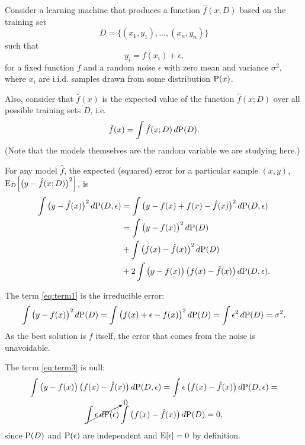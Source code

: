 Consider a learning machine that produces a function $\hat{f}(x; D)$ based on the
training set $$D = \big\{(x_1, y_1), \dots, (x_n, y_n)\big\}$$ such that
\[
  y_i = f(x_i) + \epsilon\text{,}
\]
for a fixed function $f$ and a random noise $\epsilon$ with zero mean and variance
$\sigma^2$, where $x_i$ are i.i.d. samples drawn from some distribution $\operatorname{P}(x)$.

Also, consider that $\bar{f}(x)$ is the expected value of the function $\hat{f}(x; D)$
over all possible training sets $D$, i.e.
\[
  \bar{f}(x) = \int \hat{f}(x; D)\, d\!\operatorname{P}(D)\text{.}
\]
(Note that the models themselves are the random variable we are studying here.)

For any model $\hat{f}$, the expected (squared) error for a particular sample $(x, y)$,
$\operatorname{E}_D\!\left[ \big( y - \hat{f}(x; D) \big)^2 \right]$, is
\begin{align}
  \notag \int \big( y - \hat{f}(x) \big)^2\, d\!\operatorname{P}(D, \epsilon)
    &= \int \big( y - f(x) + f(x) - \hat{f}(x) \big)^2\, d\!\operatorname{P}(D, \epsilon) \\
    &= \label{eq:term1}\int \big( y - f(x) \big)^2\, d\!\operatorname{P}(D) \\
    &+ \label{eq:term2}\int \big( f(x) - \hat{f}(x) \big)^2\, d\!\operatorname{P}(D) \\
    &+ \label{eq:term3}2 \int \big( y - f(x) \big)\,\big( f(x) - \hat{f}(x) \big)\, d\!\operatorname{P}(D, \epsilon)\text{.}
\end{align}

The term \eqref{eq:term1} is the irreducible error:
\begin{equation}
  \label{eq:irreducible-error}
  \int \big( y - f(x) \big)^2\, d\!\operatorname{P}(D) =
  \int \big( f(x) + \epsilon - f(x) \big)^2\, d\!\operatorname{P}(D) =
  \int \epsilon^2\, d\!\operatorname{P}(D) = \sigma^2\text{.}
\end{equation}
As the best solution is $f$ itself, the error that comes from the noise is unavoidable.

The term \eqref{eq:term3} is null:
\begin{multline*}
  \int \big( y - f(x) \big)\,\big( f(x) - \hat{f}(x) \big)\, d\!\operatorname{P}(D, \epsilon) =
  \int \epsilon\,\big( f(x) - \hat{f}(x) \big)\, d\!\operatorname{P}(D, \epsilon) = \\
  \cancelto{0}{\int \epsilon\, d\!\operatorname{P}(\epsilon)} \int \big( f(x) - \hat{f}(x) \big)\, d\!\operatorname{P}(D) = 0\text{,}
\end{multline*}
since $\operatorname{P}(D)$ and $\operatorname{P}(\epsilon)$ are independent and $\operatorname{E}[\epsilon] = 0$ by
definition.

